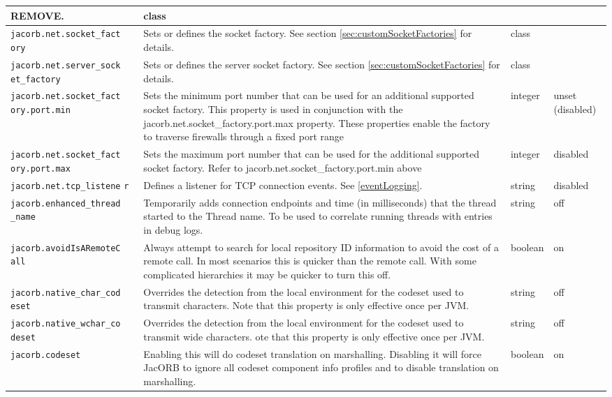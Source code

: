 {{\begin{small}
\begin{longtable}{|p{5cm}|p{7.5cm}|p{1.5cm}|p{1.5cm}|}
REMOVE. & class &  \\
\hline
\verb"jacorb.net.socket_fact"
\verb"ory" & Sets or defines the socket factory. See section \ref{sec:customSocketFactories} for details.& class & \\
\hline
\verb"jacorb.net.server_sock"
\verb"et_factory" & Sets or defines the server socket factory. See section \ref{sec:customSocketFactories} for details.& class & \\
\hline
\verb"jacorb.net.socket_fact"
\verb"ory.port.min" & Sets the minimum port number that can be used
for an additional supported socket factory. This property is used in
conjunction with the jacorb.net.socket\_factory.port.max
property. These properties enable the factory to traverse firewalls
through a fixed port range  & integer & unset (disabled) \\
\hline
\verb"jacorb.net.socket_fact"
\verb"ory.port.max" & Sets the maximum port number that can be used
for the additional supported socket factory. Refer to
jacorb.net.socket\_factory.port.min above & integer & disabled\\
\hline
\verb"jacorb.net.tcp_listene"
\verb"r" & Defines a listener for TCP connection events. See \ref{eventLogging}.
& string & disabled\\
\hline
\verb"jacorb.enhanced_thread"
\verb"_name" & Temporarily adds connection endpoints and time (in milliseconds)
that the thread started to the Thread name. To be used to correlate running
threads with entries in debug logs. & string & off\\
\hline
\verb"jacorb.avoidIsARemoteC"
\verb"all" & Always attempt to search for local repository ID information to avoid
the cost of a remote call. In most scenarios this is quicker than the remote call.
With some complicated hierarchies it may be quicker to turn this off. & boolean & on\\
\hline
\verb"jacorb.native_char_cod"
\verb"eset" & Overrides the detection from the local environment for the codeset
used to transmit characters. Note that this property is only effective once per
JVM. & string & off\\
\hline
\verb"jacorb.native_wchar_co"
\verb"deset" & Overrides the detection from the local environment for the codeset
used to transmit wide characters. ote that this property is only effective once per
JVM. & string & off\\
\hline
\verb"jacorb.codeset" &
Enabling this will do codeset translation on marshalling. Disabling it will force
JacORB to ignore all codeset component info profiles and to disable translation on
marshalling. & boolean & on\\
\hline
\end{longtable}
\end{small}

}}
